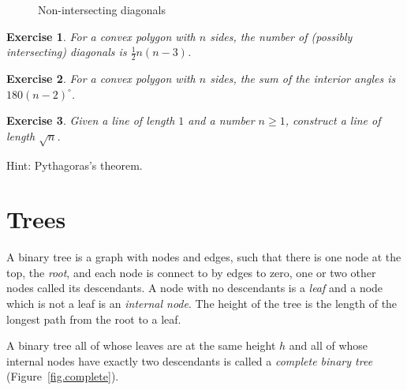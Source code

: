 \documentclass[11pt,a4paper]{report}
\newtheorem{exercise}{Exercise}
\begin{document}
\begin{figure}[t]
\begin{center}
\caption{Non-intersecting diagonals}\label{fig.diag}
\end{center}
\end{figure}

\begin{exercise}\label{e.diag}
For a convex polygon with $n$ sides, the number of (possibly intersecting) diagonals is $\frac{1}{2}n(n-3)$.
\end{exercise}

\begin{exercise}
For a convex polygon with $n$ sides, the sum of the interior angles is $180(n-2)^{\circ}$.
\end{exercise}

\begin{exercise}
Given a line of length $1$ and a number $n\geq 1$, construct a line of length $\sqrt n$.
\end{exercise}
Hint: Pythagoras's theorem.

\section{Trees}

A binary tree is a graph with nodes and edges, such that there is one node at the top, the \emph{root}, and each node is connect to by edges to zero, one or two other nodes called its descendants. A node with no descendants is a \emph{leaf} and a node which is not a leaf is an \emph{internal node}. The height of the tree is the length of the longest path from the root to a leaf.

A binary tree all of whose leaves are at the same height $h$ and all of whose internal nodes have exactly two descendants is called a \emph{complete binary tree} (Figure~\ref{fig.complete}). 
\end{document}
